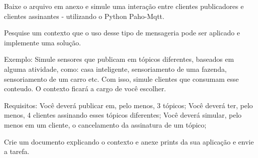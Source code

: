 Baixe o arquivo em anexo e simule uma interação entre clientes publicadores e clientes assinantes - utilizando o Python Paho-Mqtt.

Pesquise um contexto que o uso desse tipo de mensageria pode ser aplicado e implemente uma solução.

Exemplo: Simule sensores que publicam em tópicos diferentes, baseados em alguma atividade, como: casa inteligente, sensoriamento de uma fazenda, sensoriamento de um carro etc. Com isso, simule clientes que consumam esse conteudo. O contexto ficará a cargo de você escolher.

Requisitos:
Você deverá publicar em, pelo menos, 3 tópicos;
Você deverá ter, pelo menos, 4 clientes assinando esses tópicos diferentes;
Você deverá simular, pelo menos em um cliente, o cancelamento da assinatura de um tópico;

Crie um documento explicando o contexto e anexe prints da sua aplicação e envie a tarefa.